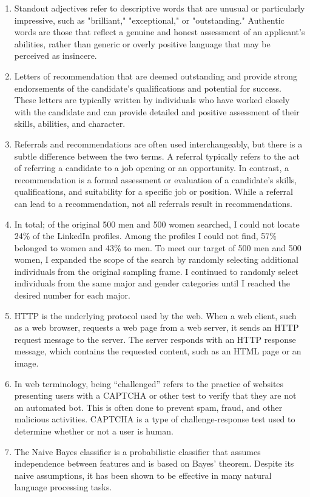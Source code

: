 \documentclass[12pt]{caltech_thesis}
\begin{document}
\begin{enumerate}
    \item Standout adjectives refer to descriptive words that are unusual or particularly impressive, such as "brilliant," "exceptional," or "outstanding." Authentic words are those that reflect a genuine and honest assessment of an applicant's abilities, rather than generic or overly positive language that may be perceived as insincere.
    \item Letters of recommendation that are deemed outstanding and provide strong endorsements of the candidate’s qualifications and potential for success. These letters are typically written by individuals who have worked closely with the candidate and can provide detailed and positive assessment of their skills, abilities, and character.
    \item Referrals and recommendations are often used interchangeably, but there is a subtle difference between the two terms. A referral typically refers to the act of referring a candidate to a job opening or an opportunity. In contrast, a recommendation is a formal assessment or evaluation of a candidate's skills, qualifications, and suitability for a specific job or position. While a referral can lead to a recommendation, not all referrals result in recommendations.
    \item In total; of the original 500 men and 500 women searched, I could not locate 24\% of the LinkedIn profiles. Among the profiles I could not find, 57\% belonged to women and 43\% to men. To meet our target of 500 men and 500 women, I expanded the scope of the search by randomly selecting additional individuals from the original sampling frame. I continued to randomly select individuals from the same major and gender categories until I reached the desired number for each major.
    \item HTTP is the underlying protocol used by the web. When a web client, such as a web browser, requests a web page from a web server, it sends an HTTP request message to the server. The server responds with an HTTP response message, which contains the requested content, such as an HTML page or an image. 
    \item In web terminology, being “challenged” refers to the practice of websites presenting users with a CAPTCHA or other test to verify that they are not an automated bot. This is often done to prevent spam, fraud, and other malicious activities. CAPTCHA is a type of challenge-response test used to determine whether or not a user is human.
    \item The Naive Bayes classifier is a probabilistic classifier that assumes independence between features and is based on Bayes' theorem. Despite its naive assumptions, it has been shown to be effective in many natural language processing tasks. 

\end{enumerate}
\end{document}
